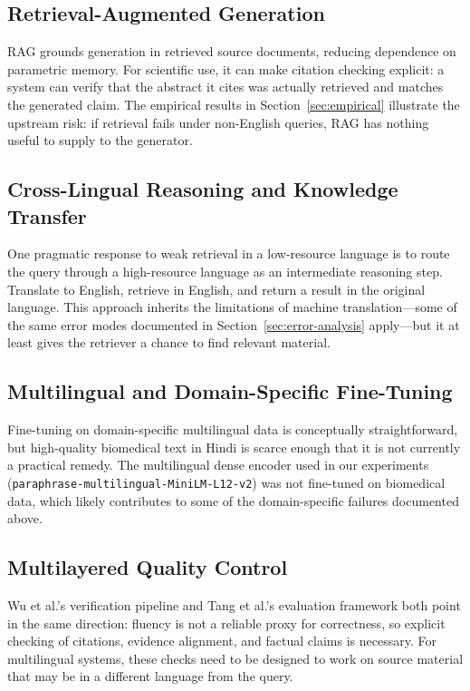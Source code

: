 \documentclass[acmsmall,screen,review]{acmart}
\begin{document}
\subsection{Retrieval-Augmented Generation}
\label{sec:rag}

RAG grounds generation in retrieved source documents, reducing dependence
on parametric memory.  For scientific use, it can make citation checking
explicit: a system can verify that the abstract it cites was actually
retrieved and matches the generated claim.  The empirical results in
Section~\ref{sec:empirical} illustrate the upstream risk: if retrieval
fails under non-English queries, RAG has nothing useful to supply to the
generator.

\subsection{Cross-Lingual Reasoning and Knowledge Transfer}
\label{sec:crosslingual-reasoning}

One pragmatic response to weak retrieval in a low-resource language is to
route the query through a high-resource language as an intermediate
reasoning step.  Translate to English, retrieve in English, and return a
result in the original language.  This approach inherits the limitations
of machine translation---some of the same error modes documented in
Section~\ref{sec:error-analysis} apply---but it at least gives the
retriever a chance to find relevant material.

\subsection{Multilingual and Domain-Specific Fine-Tuning}
\label{sec:finetuning}

Fine-tuning on domain-specific multilingual data is conceptually
straightforward, but high-quality biomedical text in Hindi is scarce
enough that it is not currently a practical remedy.  The multilingual
dense encoder used in our experiments
(\texttt{paraphrase-multilingual-MiniLM-L12-v2}) was not fine-tuned on
biomedical data, which likely contributes to some of the domain-specific
failures documented above.

\subsection{Multilayered Quality Control}
\label{sec:quality-control}

Wu et al.'s verification pipeline \citep{wu2025automated} and Tang et
al.'s evaluation framework \citep{tang2025automated} both point in the
same direction: fluency is not a reliable proxy for correctness, so
explicit checking of citations, evidence alignment, and factual claims is
necessary.  For multilingual systems, these checks need to be designed to
work on source material that may be in a different language from the query.
\end{document}
